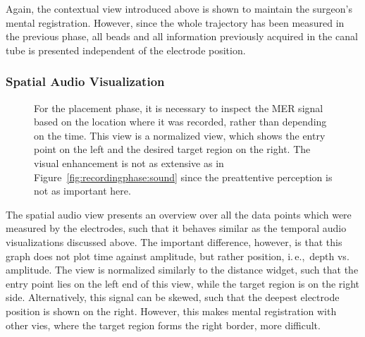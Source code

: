 \documentclass{vgtc}                          %
\begin{document}
Again, the contextual view introduced above is shown to maintain the surgeon's mental registration. However, since the whole trajectory has been measured in the previous phase, all beads and all information previously acquired in the canal tube is presented independent of the electrode position. 


\subsubsection{Spatial Audio Visualization}\label{sec:overview:placement:spatialaudio}

\begin{figure}[t]
    \centering
    \caption{For the placement phase, it is necessary to inspect the MER signal based on the location where it was recorded, rather than depending on the time. This view is a normalized view, which shows the entry point on the left and the desired target region on the right. The visual enhancement is not as extensive as in Figure~\ref{fig:recordingphase:sound} since the preattentive perception is not as important here.}
    \label{fig:placementphase:spatialsound}
\end{figure}

The spatial audio view presents an overview over all the data points which were measured by the electrodes, such that it behaves similar as the temporal audio visualizations discussed above. The important difference, however, is that this graph does not plot time against amplitude, but rather position, i.\,e.,~depth vs. amplitude. The view is normalized similarly to the distance widget, such that the entry point lies on the left end of this view, while the target region is on the right side. Alternatively, this signal can be skewed, such that the deepest electrode position is shown on the right. However, this makes mental registration with other vies, where the target region forms the right border, more difficult.
\end{document}
